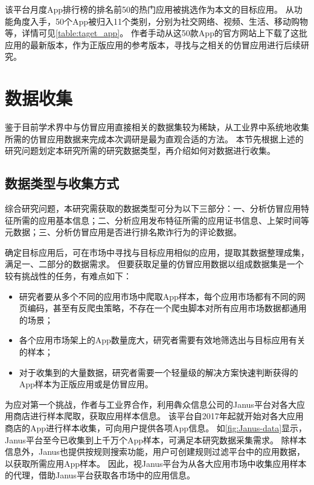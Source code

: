 该平台月度App排行榜的排名前50的热门应用被挑选作为本文的目标应用。
从功能角度入手，50个App被归入11个类别，分别为社交网络、视频、生活、移动购物等，详情可见\autoref{table:taget_app}。
作者手动从这50款App的官方网站上下载了这批应用的最新版本，作为正版应用的参考版本，寻找与之相关的仿冒应用进行后续研究。


\section{数据收集}
鉴于目前学术界中与仿冒应用直接相关的数据集较为稀缺，从工业界中系统地收集所需的仿冒应用数据来完成本次调研是最为直观合适的方法。
本节先根据上述的研究问题划定本研究所需的研究数据类型，再介绍如何对数据进行收集。

\subsection{数据类型与收集方式}

综合研究问题，本研究需获取的数据类型可分为以下三部分：一、分析仿冒应用特征所需的应用基本信息；二、分析应用发布特征所需的应用证书信息、上架时间等元数据；三、分析仿冒应用是否进行排名欺诈行为的评论数据。

确定目标应用后，可在市场中寻找与目标应用相似的应用，提取其数据整理成集，满足一、二部分的数据需求。
但要获取足量的仿冒应用数据以组成数据集是一个较有挑战性的任务，有难点如下：
\begin{itemize}
	\item 研究者要从多个不同的应用市场中爬取App样本，每个应用市场都有不同的网页编码，甚至有反爬虫策略，不存在一个爬虫脚本对所有应用市场数据都通用的场景；
	\item 各个应用市场架上的App数量庞大，研究者需要有效地筛选出与目标应用有关的样本；
	\item 对于收集到的大量数据，研究者需要一个轻量级的解决方案快速判断获得的App样本为正版应用或是仿冒应用。
\end{itemize}

为应对第一个挑战，作者与工业界合作，利用犇众信息公司的Janus平台对各大应用商店进行样本爬取，获取应用样本信息。
该平台自2017年起就开始对各大应用商店的App进行样本收集，可向用户提供各项App信息。
如\autoref{fig:Janus-data}显示，Janus平台至今已收集到上千万个App样本，可满足本研究数据采集需求。
除样本信息外，Janus也提供按规则搜索功能，用户可创建规则过滤平台中的应用数据，以获取所需应用App样本。
因此，视Janus平台为从各大应用市场中收集应用样本的代理，借助Janus平台获取各市场中的应用信息。

